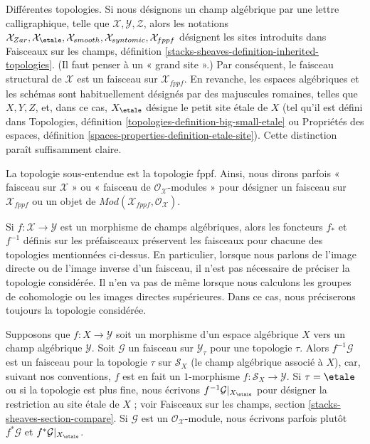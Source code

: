 \noindent
Différentes topologies. Si nous désignons un champ algébrique par une lettre
calligraphique, telle que $\mathcal{X}, \mathcal{Y}, \mathcal{Z}$, alors les notations
$\mathcal{X}_{Zar}, \mathcal{X}_\etale, \mathcal{X}_{smooth},
\mathcal{X}_{syntomic}, \mathcal{X}_{fppf}$ désignent les sites introduits
dans
Faisceaux sur les champs, définition
\ref{stacks-sheaves-definition-inherited-topologies}.
(Il faut penser à un « grand site ».) Par conséquent, le faisceau structural de
$\mathcal{X}$ est un faisceau sur $\mathcal{X}_{fppf}$.
En revanche, les espaces algébriques et les schémas
sont habituellement désignés par des majuscules romaines, telles que $X, Y, Z$, et, dans ce cas,
$X_\etale$ désigne le petit site étale de $X$ (tel qu'il est
défini dans
Topologies, définition
\ref{topologies-definition-big-small-etale}
ou
Propriétés des espaces, définition
\ref{spaces-properties-definition-etale-site}).
Cette distinction paraît suffisamment claire.

\medskip\noindent
La topologie sous-entendue est la topologie fppf. Ainsi, nous dirons parfois
« faisceau sur $\mathcal{X}$ » ou « faisceau de $\mathcal{O}_\mathcal{X}$-modules »
pour désigner un faisceau sur $\mathcal{X}_{fppf}$ ou un objet de
$\textit{Mod}(\mathcal{X}_{fppf}, \mathcal{O}_\mathcal{X})$.

\medskip\noindent
Si $f : \mathcal{X} \to \mathcal{Y}$ est un morphisme de champs
algébriques, alors les foncteurs $f_*$ et $f^{-1}$ définis sur les préfaisceaux
préservent les faisceaux pour chacune des topologies mentionnées ci-dessus. En particulier,
lorsque nous parlons de l'image directe ou de l'image inverse d'un faisceau, il n'est pas nécessaire
de préciser la topologie considérée. Il n'en va pas de même
lorsque nous calculons les groupes de cohomologie ou les images directes supérieures. Dans ce
cas, nous préciserons toujours la topologie considérée.

\medskip\noindent
Supposons que $f : X \to \mathcal{Y}$ soit un morphisme d'un espace
algébrique $X$ vers un champ algébrique $\mathcal{Y}$. Soit $\mathcal{G}$
un faisceau sur $\mathcal{Y}_\tau$ pour une topologie $\tau$. Alors
$f^{-1}\mathcal{G}$ est un faisceau pour la topologie $\tau$ sur $\mathcal{S}_X$
(le champ algébrique associé à $X$), car, suivant nos conventions, $f$
est en fait un $1$-morphisme $f : \mathcal{S}_X \to \mathcal{Y}$.
Si $\tau = \etale$ ou si la topologie est plus fine, nous écrivons
$f^{-1}\mathcal{G}|_{X_\etale}$
pour désigner la restriction au site étale de $X$ ; voir
Faisceaux sur les champs, section \ref{stacks-sheaves-section-compare}.
Si $\mathcal{G}$ est un $\mathcal{O}_\mathcal{X}$-module, nous écrivons parfois
plutôt
$f^*\mathcal{G}$ et $f^*\mathcal{G}|_{X_\etale}$.




